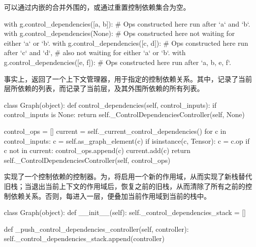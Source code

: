 \begin{content}
可以通过内嵌的合并外围的，或通过重置控制依赖集合为空。

\begin{leftbar}
\begin{python}
with g.control_dependencies([a, b]):
  # Ops constructed here run after `a` and `b`.
  with g.control_dependencies(None):
    # Ops constructed here not waiting for either `a` or `b`.
    with g.control_dependencies([c, d]):
      # Ops constructed here run after `c` and `d`, 
      # also not waiting for either `a` or `b`.
  with g.control_dependencies([e, f]):
    # Ops constructed here run after `a, b, e, f`.
\end{python}
\end{leftbar}

事实上，返回了一个上下文管理器，用于指定的控制依赖关系。其中，记录了当前层所依赖的列表，而记录了当前层，及其外围所依赖的所有列表。

\begin{leftbar}
\begin{python}
class Graph(object):
  def control_dependencies(self, control_inputs):
    if control_inputs is None:
      return self._ControlDependenciesController(self, None)

    control_ops = []
    current = self._current_control_dependencies()
    for c in control_inputs:
      c = self.as_graph_element(c)
      if isinstance(c, Tensor):
        c = c.op
      if c not in current:
        control_ops.append(c)
        current.add(c)
    return self._ControlDependenciesController(self, control_ops)
\end{python}
\end{leftbar}

实现了一个控制依赖的控制器。为，将启用一个新的作用域，从而实现了新栈替代旧栈；当退出当前上下文的作用域后，恢复之前的旧栈，从而清除了所有之前的控制依赖关系。否则，每进入一层，便叠加当前作用域到当前的栈中。

\begin{leftbar}
\begin{python}
class Graph(object):
  def __init__(self):
    self._control_dependencies_stack = []

  def _push_control_dependencies_controller(self, controller):
    self._control_dependencies_stack.append(controller)


\end{python}
\end{leftbar}
\end{content}
